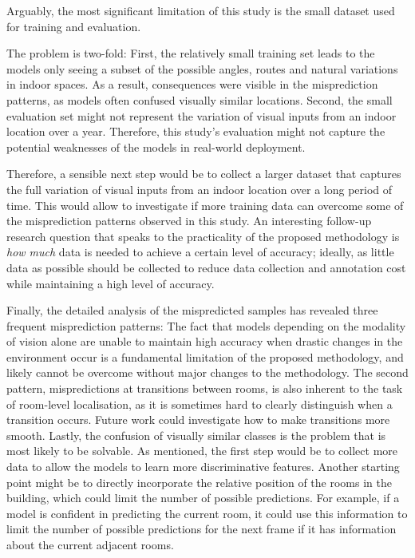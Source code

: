 \documentclass[a4paper]{article}
\begin{document}

Arguably, the most significant limitation of this study is the small dataset
used for training and evaluation. 

The problem is two-fold: First, the relatively small training set leads to the
models only seeing a subset of the possible angles, routes and natural
variations in indoor spaces. As a result, consequences were visible in the
misprediction patterns, as models often confused visually similar locations.
Second, the small evaluation set might not represent the variation of visual
inputs from an indoor location over a year. Therefore, this study's evaluation
might not capture the potential weaknesses of the models in real-world
deployment.

Therefore, a sensible next step would be to collect a larger dataset that
captures the full variation of visual inputs from an indoor location over a long
period of time. This would allow to investigate if more training data can
overcome some of the misprediction patterns observed in this study. An
interesting follow-up research question that speaks to the practicality of the
proposed methodology is \textit{how much} data is needed to achieve a certain
level of accuracy; ideally, as little data as possible should be collected to
reduce data collection and annotation cost while maintaining a high level of
accuracy.


Finally, the detailed analysis of the mispredicted samples has revealed three
frequent misprediction patterns: The fact that models depending on the modality
of vision alone are unable to maintain high accuracy when drastic changes in the
environment occur is a fundamental limitation of the proposed methodology, and
likely cannot be overcome without major changes to the methodology. The second
pattern, mispredictions at transitions between rooms, is also inherent to the
task of room-level localisation, as it is sometimes hard to clearly distinguish
when a transition occurs. Future work could investigate how to make transitions
more smooth. Lastly, the confusion of visually similar classes is the problem
that is most likely to be solvable. As mentioned, the first step would be to
collect more data to allow the models to learn more discriminative features.
Another starting point might be to directly incorporate the relative position of
the rooms in the building, which could limit the number of possible predictions.
For example, if a model is confident in predicting the current room, it could
use this information to limit the number of possible predictions for the next
frame if it has information about the current adjacent rooms.
\end{document}
